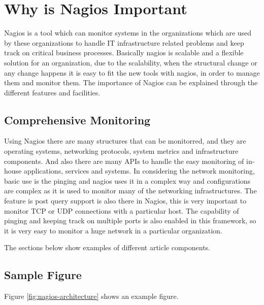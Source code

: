 \documentclass[9pt,twocolumn,twoside]{styles/osajnl}
\begin{document}
\section{Why is Nagios Important}

Nagios is a tool which can monitor systems in the organizations which are used by these organizations to handle IT infrastructure related problems and keep track on critical business processes.
Basically nagios is scalable and a flexible solution for an organization, due to the scalability, when the structural change or any change happens it is easy to fit the new tools with nagios, in order to manage them and monitor them. The importance of Nagios can be explained through the different features and facilities.

\subsection{Comprehensive Monitoring}

Using Nagios there are many structures that can be monitorred, and they are  operating systems, networking protocols, system metrics and infrastructure components. And also there are many APIs to handle the easy monitoring of in-house applications, services and systems. In considering the network monitoring, basic use is the pinging and nagios uses it in a complex way and configurations are complex as it is used to monitor many of the networking infrastructures. The feature is post query support is also there in Nagios, this is very important to monitor TCP or UDP connections with a particular host. The capability of pinging and keeping track on multiple ports is also enabled in this framework, so it is very easy to monitor a huge network in a particular organization.  



\label{sec:examples}

The sections below show examples of different article components.

\subsection{Sample Figure}

Figure \ref{fig:nagios-architecture} shows an example figure.
\end{document}
